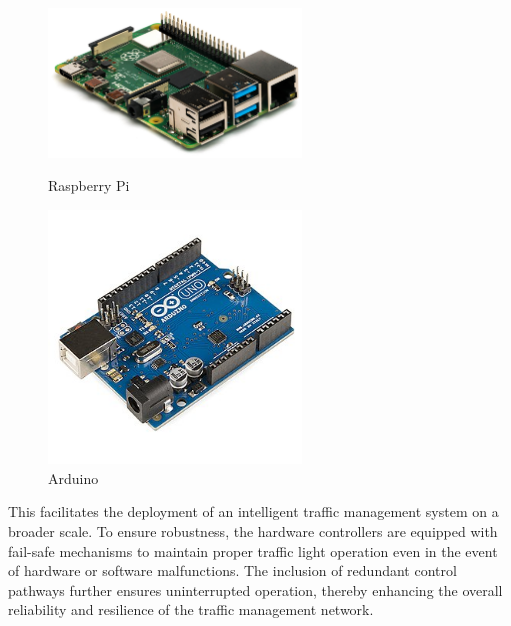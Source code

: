 \documentclass[usenatbib]{tjaa}
\begin{document}
\begin{figure}[H]
    \centering
    \begin{minipage}{0.5\textwidth}
        \centering
        \includegraphics[width=0.6\textwidth]{4.jpg}
        \caption{Raspberry Pi}
        \label{fig:wrap2}
    \end{minipage}%
    \hfill %
    \begin{minipage}{0.4\textwidth}
        \centering
        \includegraphics[width=0.6\textwidth]{5.jpg}
        \caption{Arduino}
        \label{fig:wrap3}
    \end{minipage}
\end{figure}

 This facilitates the deployment of an intelligent traffic management system on a broader scale. To ensure robustness, the hardware controllers are equipped with fail-safe mechanisms to maintain proper traffic light operation even in the event of hardware or software malfunctions. The inclusion of redundant control pathways further ensures uninterrupted operation, thereby enhancing the overall reliability and resilience of the traffic management network.
 
\end{document}
